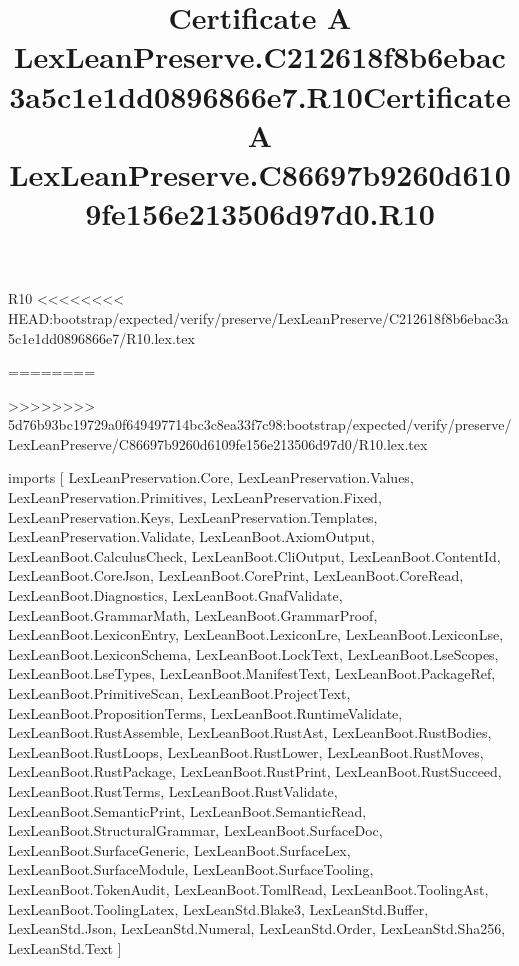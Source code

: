 \begin{lexlean}{R10}
<<<<<<<< HEAD:bootstrap/expected/verify/preserve/LexLeanPreserve/C212618f8b6ebac3a5c1e1dd0896866e7/R10.lex.tex
\title{Certificate A LexLeanPreserve.C212618f8b6ebac3a5c1e1dd0896866e7.R10}
========
\title{Certificate A LexLeanPreserve.C86697b9260d6109fe156e213506d97d0.R10}
>>>>>>>> 5d76b93bc19729a0f649497714bc3c8ea33f7c98:bootstrap/expected/verify/preserve/LexLeanPreserve/C86697b9260d6109fe156e213506d97d0/R10.lex.tex
\begin{coremodule}
imports [
  LexLeanPreservation.Core,
  LexLeanPreservation.Values,
  LexLeanPreservation.Primitives,
  LexLeanPreservation.Fixed,
  LexLeanPreservation.Keys,
  LexLeanPreservation.Templates,
  LexLeanPreservation.Validate,
  LexLeanBoot.AxiomOutput,
  LexLeanBoot.CalculusCheck,
  LexLeanBoot.CliOutput,
  LexLeanBoot.ContentId,
  LexLeanBoot.CoreJson,
  LexLeanBoot.CorePrint,
  LexLeanBoot.CoreRead,
  LexLeanBoot.Diagnostics,
  LexLeanBoot.GnafValidate,
  LexLeanBoot.GrammarMath,
  LexLeanBoot.GrammarProof,
  LexLeanBoot.LexiconEntry,
  LexLeanBoot.LexiconLre,
  LexLeanBoot.LexiconLse,
  LexLeanBoot.LexiconSchema,
  LexLeanBoot.LockText,
  LexLeanBoot.LseScopes,
  LexLeanBoot.LseTypes,
  LexLeanBoot.ManifestText,
  LexLeanBoot.PackageRef,
  LexLeanBoot.PrimitiveScan,
  LexLeanBoot.ProjectText,
  LexLeanBoot.PropositionTerms,
  LexLeanBoot.RuntimeValidate,
  LexLeanBoot.RustAssemble,
  LexLeanBoot.RustAst,
  LexLeanBoot.RustBodies,
  LexLeanBoot.RustLoops,
  LexLeanBoot.RustLower,
  LexLeanBoot.RustMoves,
  LexLeanBoot.RustPackage,
  LexLeanBoot.RustPrint,
  LexLeanBoot.RustSucceed,
  LexLeanBoot.RustTerms,
  LexLeanBoot.RustValidate,
  LexLeanBoot.SemanticPrint,
  LexLeanBoot.SemanticRead,
  LexLeanBoot.StructuralGrammar,
  LexLeanBoot.SurfaceDoc,
  LexLeanBoot.SurfaceGeneric,
  LexLeanBoot.SurfaceLex,
  LexLeanBoot.SurfaceModule,
  LexLeanBoot.SurfaceTooling,
  LexLeanBoot.TokenAudit,
  LexLeanBoot.TomlRead,
  LexLeanBoot.ToolingAst,
  LexLeanBoot.ToolingLatex,
  LexLeanStd.Blake3,
  LexLeanStd.Buffer,
  LexLeanStd.Json,
  LexLeanStd.Numeral,
  LexLeanStd.Order,
  LexLeanStd.Sha256,
  LexLeanStd.Text
]


\end{coremodule}
\end{lexlean}
